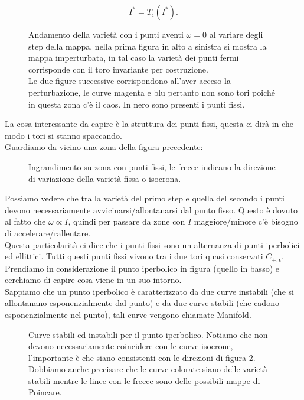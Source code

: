 \[
    I^* = T_{\epsilon}(I^*)
.\] 
\begin{figure}[H]
    \centering
    \caption{\scriptsize Andamento della varietà con i punti aventi $\omega =0$ al variare degli step della mappa, nella prima figura in alto a sinistra si mostra la mappa imperturbata, in tal caso la varietà dei punti fermi corrisponde con il toro invariante per costruzione.\\
    Le due figure successive corrispondono all'aver acceso la perturbazione, le curve magenta e blu pertanto non sono tori poiché in questa zona c'è il caos. In nero sono presenti i punti fissi.}
    \label{fig:19_tori_step}
\end{figure}
\noindent
La cosa interessante da capire è la struttura dei punti fissi, questa ci dirà in che modo i tori si stanno spaccando. \\
Guardiamo da vicino una zona della figura precedente: 
\begin{figure}[H]
    \centering
    \caption{\scriptsize Ingrandimento su zona con punti fissi, le frecce indicano la direzione di variazione della varietà fissa o isocrona.}
    \label{fig:19_tori_ingrandimento}
\end{figure}
\noindent
Possiamo vedere che tra la varietà del primo step e quella del secondo i punti devono necessariamente avvicinarsi/allontanarsi dal punto fisso. Questo è dovuto al fatto che $\omega \propto I$, quindi per passare da zone con $I$ maggiore/minore c'è bisogno di accelerare/rallentare.\\
Questa particolarità ci dice che i punti fissi sono un alternanza di punti iperbolici ed ellittici. Tutti questi punti fissi vivono tra i due tori quasi conservati $C_{\pm, \epsilon}$.\\
Prendiamo in considerazione il punto iperbolico in figura (quello in basso) e cerchiamo di capire cosa viene in un suo intorno.\\
Sappiamo che un punto iperbolico è caratterizzato da due curve instabili (che si allontanano esponenzialmente dal punto) e da due curve stabili (che cadono esponenzialmente nel punto), tali curve vengono chiamate Manifold.
\begin{figure}[H]
    \centering
    \caption{\scriptsize Curve stabili ed instabili per il punto iperbolico. Notiamo che non devono necessariamente coincidere con le curve isocrone, l'importante è che siano consistenti con le direzioni di figura \ref{fig:19_tori_ingrandimento}.\\
    Dobbiamo anche precisare che le curve colorate siano delle varietà stabili mentre le linee con le frecce sono delle possibili mappe di Poincare.}
    \label{fig:19_stab_instab}
\end{figure}
